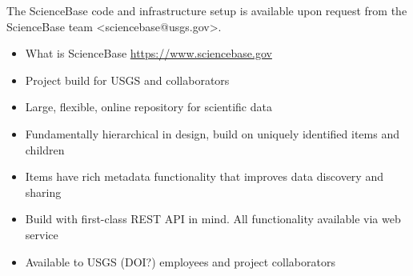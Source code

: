 The ScienceBase code and infrastructure setup is available upon 
request from the ScienceBase team <sciencebase@usgs.gov>.



\begin{itemize}
	\item{What is ScienceBase \url{https://www.sciencebase.gov}}
	\item{Project build for USGS and collaborators}
	\item{Large, flexible, online repository for scientific data}
	\item{Fundamentally hierarchical in design, build on uniquely identified items and children}
	\item{Items have rich metadata functionality that improves data discovery and sharing}
	\item{Build with first-class REST API in mind. All functionality available via web service}
	\item{Available to USGS (DOI?) employees and project collaborators}
\end{itemize}
